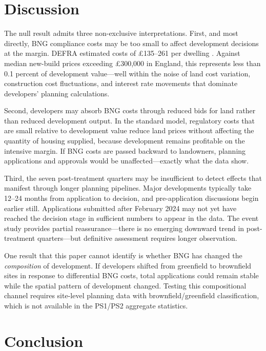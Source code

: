 \documentclass[12pt]{article}
\begin{document}
\section{Discussion}

The null result admits three non-exclusive interpretations. First, and most directly, BNG compliance costs may be too small to affect development decisions at the margin. DEFRA estimated costs of \pounds135--261 per dwelling \citep{DEFRA2023}. Against median new-build prices exceeding \pounds300,000 in England, this represents less than 0.1 percent of development value---well within the noise of land cost variation, construction cost fluctuations, and interest rate movements that dominate developers' planning calculations.

Second, developers may absorb BNG costs through reduced bids for land rather than reduced development output. In the standard \citet{Glaeser2009} model, regulatory costs that are small relative to development value reduce land prices without affecting the quantity of housing supplied, because development remains profitable on the intensive margin. If BNG costs are passed backward to landowners, planning applications and approvals would be unaffected---exactly what the data show.

Third, the seven post-treatment quarters may be insufficient to detect effects that manifest through longer planning pipelines. Major developments typically take 12--24 months from application to decision, and pre-application discussions begin earlier still. Applications submitted after February 2024 may not yet have reached the decision stage in sufficient numbers to appear in the data. The event study provides partial reassurance---there is no emerging downward trend in post-treatment quarters---but definitive assessment requires longer observation.

One result that this paper cannot identify is whether BNG has changed the \textit{composition} of development. If developers shifted from greenfield to brownfield sites in response to differential BNG costs, total applications could remain stable while the spatial pattern of development changed. Testing this compositional channel requires site-level planning data with brownfield/greenfield classification, which is not available in the PS1/PS2 aggregate statistics.

\section{Conclusion}
\end{document}
